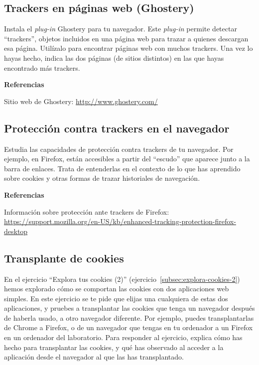 \subsection{Trackers en páginas web (Ghostery)}
\label{subsec:trackers-paginas-web-2}

Instala el \emph{plug-in} Ghostery para tu navegador. Este \emph{plug-in} permite detectar ``trackers'', objetos incluidos en una página web para trazar a quienes descargan esa página. Utilízalo para encontrar páginas web con muchos trackers. Una vez lo hayas hecho, indica las dos páginas (de sitios distintos) en las que hayas encontrado más trackers.

\textbf{Referencias}

Sitio web de Ghostery: \url{http://www.ghostery.com/}

\subsection{Protección contra trackers en el navegador}
\label{subsec:trackers-navegador}

Estudia las capacidades de protección contra trackers de tu navegador. Por ejemplo, en Firefox, están accesibles a partir del ``escudo'' que aparece junto a la barra de enlaces. Trata de entenderlas en el contexto de lo que has aprendido sobre cookies y otras formas de trazar historiales de navegación.

\textbf{Referencias}

Información sobre protección ante trackers de Firefox: \\
\url{https://support.mozilla.org/en-US/kb/enhanced-tracking-protection-firefox-desktop}

\subsection{Transplante de cookies}
\label{subsec:transplante-cookies}

En el ejercicio ``Explora tus cookies (2)'' (ejercicio~\ref{subsec:explora-cookies-2}) hemos explorado cómo se comportan las cookies con dos aplicaciones web simples. En este ejercicio se te pide que elijas una cualquiera de estas dos aplicaciones, y pruebes a transplantar las cookies que tenga un navegador después de haberla usado, a otro navegador diferente. Por ejemplo, puedes transplantarlas de Chrome a Firefox, o de un navegador que tengas en tu ordenador a un Firefox en un ordenador del laboratorio. Para responder al ejercicio, explica cómo has hecho para transplantar las cookies, y qué has observado al acceder a la aplicación desde el navegador al que las has transplantado.

